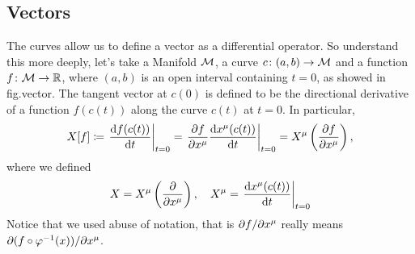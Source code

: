 \subsection{Vectors}
The curves allow us to define a vector as a differential operator. So understand this more deeply, let's take a Manifold $\mathcal{M}$, a curve $c\colon (a,b) \to \mathcal{M}$ and a function $f \colon \mathcal{M} \to \mathbb{R}$, where $(a,b)$ is an open interval containing $t=0$, as showed in fig.\color{red}vector\color{black}. The tangent vector at $c(0)$ is defined to be the directional derivative of a function $f(c(t))$ along the curve $c(t)$ at $t=0$. In particular,
\begin{equation}
    X[f] \coloneq \left. \frac{\mathop{}\!\mathrm{d} f (c(t))}{\mathop{}\!\mathrm{d} t}\right|_{t=0} = \left. \frac{\partial f}{\partial x^\mu} \frac{\mathop{}\!\mathrm{d} x^\mu(c(t))}{\mathop{}\!\mathrm{d} t} \right|_{t=0} = X^\mu \left(\frac{\partial f}{\partial x^\mu}\right),
\end{equation}
where we defined
\begin{equation}\label{eq:def-vectors}
    X = X^\mu \left(\frac{\partial}{\partial x^\mu}\right), \quad X^\mu = \left. \frac{\mathop{}\!\mathrm{d} x^\mu(c(t))}{\mathop{}\!\mathrm{d} t} \right|_{t=0}
\end{equation}
Notice that we used abuse of notation, that is $\partial f / \partial x^\mu$ really means $\partial (f \circ \varphi^{-1}(x))/\partial x^\mu$.


